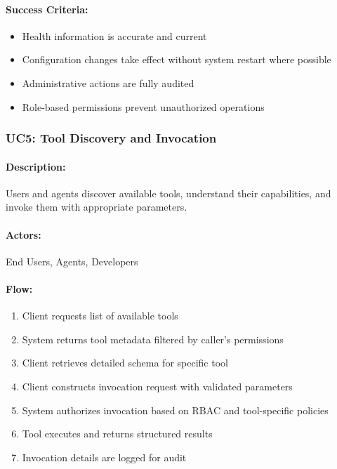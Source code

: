 \documentclass[a4paper,twoside]{sapthesis}
\begin{document}
\paragraph{Success Criteria:}
\begin{itemize}
    \item Health information is accurate and current
    \item Configuration changes take effect without system restart where possible
    \item Administrative actions are fully audited
    \item Role-based permissions prevent unauthorized operations
\end{itemize}

\subsubsection{UC5: Tool Discovery and Invocation}

\paragraph{Description:} Users and agents discover available tools, understand their capabilities, and invoke them with appropriate parameters.

\paragraph{Actors:} End Users, Agents, Developers

\paragraph{Flow:}
\begin{enumerate}
    \item Client requests list of available tools
    \item System returns tool metadata filtered by caller's permissions
    \item Client retrieves detailed schema for specific tool
    \item Client constructs invocation request with validated parameters
    \item System authorizes invocation based on RBAC and tool-specific policies
    \item Tool executes and returns structured results
    \item Invocation details are logged for audit
\end{enumerate}
\end{document}
